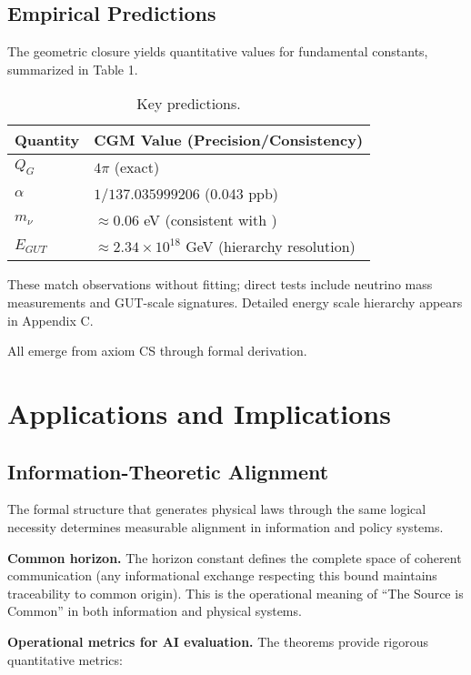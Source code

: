 \documentclass[11pt,a4paper]{article}
\theoremstyle{definition}
\theoremstyle{remark}
\begin{document}
\subsection{Empirical Predictions}

The geometric closure yields quantitative values for fundamental constants, summarized in Table 1.

\begin{table}[h]
\centering
\begin{tabular}{ll}
\toprule
Quantity & CGM Value (Precision/Consistency) \\
\midrule
$Q_G$ & $4\pi$ (exact) \\
$\alpha$ & $1/137.035999206$ (0.043 ppb) \\
$m_\nu$ & $\approx 0.06$ eV (consistent with \cite{PDG2024}) \\
$E_{GUT}$ & $\approx 2.34\times10^{18}$ GeV (hierarchy resolution) \\
\bottomrule
\end{tabular}
\caption{Key predictions.}
\end{table}

These match observations without fitting; direct tests include neutrino mass measurements and GUT-scale signatures. Detailed energy scale hierarchy appears in Appendix C.

All emerge from axiom CS through formal derivation.


\section{Applications and Implications}

\subsection{Information-Theoretic Alignment}

The formal structure that generates physical laws through the same logical necessity determines measurable alignment in information and policy systems.

\textbf{Common horizon.} The horizon constant defines the complete space of coherent communication (any informational exchange respecting this bound maintains traceability to common origin). This is the operational meaning of ``The Source is Common'' in both information and physical systems.

\textbf{Operational metrics for AI evaluation.} The theorems provide rigorous quantitative metrics:
\end{document}
